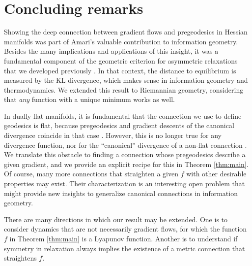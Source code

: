 \documentclass{amsart}
\theoremstyle{definition}
\begin{document}


\section{Concluding remarks}\label{sec:conclusion}

Showing the deep connection between gradient flows and pregeodesics in Hessian manifolds was part of Amari's valuable contribution to information geometry. Besides the many implications and applications of this insight, it was a fundamental component of the geometric
criterion for asymmetric relaxations that we developed previously \cite{bravetti_asymmetric_2025}. In that context, the distance to equilibrium is measured by the KL divergence, which makes sense in information geometry and thermodynamics. 
We extended this result to Riemannian geometry, considering that \textit{any} function with a unique minimum works as well. 

In dually flat manifolds, it is fundamental that the connection we use to define geodesics is flat, because pregeodesics and gradient descents of the canonical divergence coincide in that case \cite{fujiwara_gradient_1995}. However, this is no longer true for any divergence function, nor for the ``canonical'' divergence of a non-flat connection \cite{ay_novel_2015}. 
We translate this obstacle to finding a connection whose pregeodesics describe a given gradient, and we provide an explicit recipe for this in Theorem \ref{thm:main}. Of course, many more connections that straighten a given $f$ with other desirable properties may exist. Their characterization is an interesting open problem that might provide new insights to generalize canonical connections in information geometry.


There are many directions in which our result may be extended. One is to consider dynamics that are not necessarily gradient flows, for which the function $f$ in Theorem \ref{thm:main} is a Lyapunov function. 
Another is to understand if symmetry in relaxation always implies
the existence of a metric connection that straightens $f$.
\end{document}
